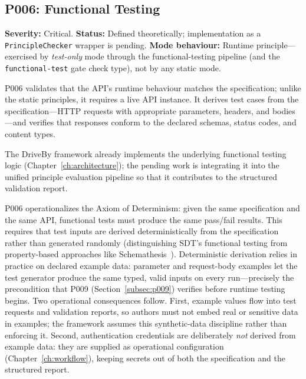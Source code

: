 \subsection{P006: Functional Testing}
\label{subsec:p006}

\textbf{Severity:} Critical. \textbf{Status:} Defined theoretically; implementation as a \texttt{PrincipleChecker} wrapper is pending. \textbf{Mode behaviour:} Runtime principle---exercised by \textit{test-only} mode through the functional-testing pipeline (and the \texttt{functional-test} gate check type), not by any static mode.

P006 validates that the API's runtime behaviour matches the specification; unlike the static principles, it requires a live API instance. It derives test cases from the specification---HTTP requests with appropriate parameters, headers, and bodies---and verifies that responses conform to the declared schemas, status codes, and content types.

The DriveBy framework already implements the underlying functional testing logic (Chapter~\ref{ch:architecture}); the pending work is integrating it into the unified principle evaluation pipeline so that it contributes to the structured validation report.

P006 operationalizes the Axiom of Determinism: given the same specification and the same API, functional tests must produce the same pass/fail results. This requires that test inputs are derived deterministically from the specification rather than generated randomly (distinguishing SDT's functional testing from property-based approaches like Schemathesis~\cite{schemathesis}). Deterministic derivation relies in practice on declared example data: parameter and request-body examples let the test generator produce the same typed, valid inputs on every run---precisely the precondition that P009 (Section~\ref{subsec:p009}) verifies before runtime testing begins. Two operational consequences follow. First, example values flow into test requests and validation reports, so authors must not embed real or sensitive data in examples; the framework assumes this synthetic-data discipline rather than enforcing it. Second, authentication credentials are deliberately \emph{not} derived from example data: they are supplied as operational configuration (Chapter~\ref{ch:workflow}), keeping secrets out of both the specification and the structured report.

